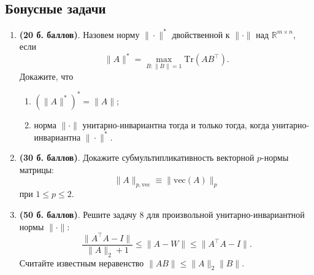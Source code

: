 \documentclass{article}
\begin{document}
\subsection*{Бонусные задачи}
\begin{enumerate}
    \item \textbf{(20 б. баллов)}. 
    Назовем норму $\|\cdot\|^{*}$ двойственной к $\|\cdot\|$ над $\mathbb{R}^{m\times n}$, если 
    \[
        \|A\|^{*} = \max_{B\colon \|B\|=1} \mathrm{Tr}\left(AB^\top\right).
    \]
    Докажите, что
    \begin{enumerate}
        \item $\left(\|A\|^{*}\right)^* = \|A\|$;
        \item норма $\|\cdot\|$ унитарно-инвариантна тогда и только тогда, когда унитарно-инвариантна $\|\cdot\|^{*}$.
    \end{enumerate}
    \item \textbf{(30 б. баллов)}.
 Докажите субмультипликативность векторной $p$-нормы матрицы:
        \[
            \|A\|_{p,\mathrm{vec}} \equiv \|\mathrm{vec}(A)\|_p
        \]
        при $1\leq p \leq 2$.
     \item \textbf{(50 б. баллов)}.
     Решите задачу 8 для произвольной унитарно-инвариантной нормы $\|\cdot\|$: 
    \[  
        \frac{\|A^\top A - I\|}{\|A\|_2 + 1} \leq \|A - W \| \leq \|A^\top  A - I\|.
    \]
    Считайте известным неравенство $\|AB\|\leq \|A\|_2 \|B\|$.
\end{enumerate}
\end{document}
